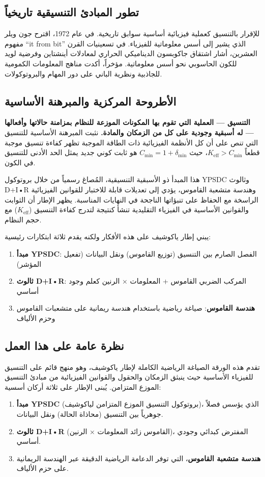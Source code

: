 \documentclass[11pt,a4paper]{article}
\begin{document}
	\subsection{تطور المبادئ التنسيقية تاريخياً}
	للإقرار بالتنسيق كعملية فيزيائية أساسية سوابق تاريخية. في عام 1972، اقترح جون ويلر مفهوم ``it from bit'' الذي يشير إلى أسس معلوماتية للفيزياء. في تسعينيات القرن العشرين، أشار اشتقاق جاكوبسون الديناميكي الحراري لمعادلات أينشتاين وفرضية لويد للكون الحاسوبي نحو أسس معلوماتية. مؤخراً، أكدت مناهج المعلومات الكمومية للجاذبية ونظرية الباني على دور المهام والبروتوكولات.
	
	\subsection{الأطروحة المركزية والمبرهنة الأساسية}
	
	\textbf{التنسيق — العملية التي تقوم بها المكونات الموزعة للنظام بمزامنة حالاتها وأفعالها — له أسبقية وجودية على كل من الزمكان والمادة.} نثبت المبرهنة الأساسية للتنسيق التي تنص على أن كل الأنظمة الفيزيائية ذات الطاقة الموجبة تظهر كفاءة تنسيق موجبة قطعاً $K_{\mathrm{eff}} > C_{\min}$، حيث $C_{\min} = 1 + \delta_{\min}$ هو ثابت كوني جديد يمثل الحد الأدنى للتنسيق في الكون.
	
	هذا المبدأ ذو الأسبقية التنسيقية، المُصاغ رسمياً من خلال بروتوكول YPSDC وثالوث D+I•R وهندسة متشعبة القاموس، يؤدي إلى تعديلات قابلة للاختبار للقوانين الفيزيائية الراسخة مع الحفاظ على تنبؤاتها الناجحة في النهايات المناسبة. يظهر الإطار أن الثوابت والقوانين الأساسية في الفيزياء التقليدية تنشأ كنتيجة لتدرج كفاءة التنسيق ($K_{\mathrm{eff}}$) مع حجم النظام.
	
	يبني إطار ياكوشيف على هذه الأفكار ولكنه يقدم ثلاثة ابتكارات رئيسية:
	\begin{enumerate}
		\item \textbf{مبدأ YPSDC}: الفصل الصارم بين التنسيق (توزيع القاموس) ونقل البيانات (تفعيل المؤشر)
		\item \textbf{ثالوث D+I•R}: المركب الضربي القاموس + المعلومات × الرنين كعلم وجود أساسي
		\item \textbf{هندسة القاموس}: صياغة رياضية باستخدام هندسة ريمانية على متشعبات القاموس وحزم الألياف
	\end{enumerate}
	
	\subsection{نظرة عامة على هذا العمل}
	تقدم هذه الورقة الصياغة الرياضية الكاملة لإطار ياكوشيف، وهو منهج قائم على التنسيق للفيزياء الأساسية حيث ينبثق الزمكان والحقول والقوانين الفيزيائية من مبادئ التنسيق الموزع المتزامن. يُبنى الإطار على ثلاثة أركان أسسية:
	\begin{enumerate}
		\item \textbf{مبدأ YPSDC} (بروتوكول التنسيق الموزع المتزامن لياكوشيف)، الذي يؤسس فصلاً جوهرياً بين التنسيق (محاذاة الحالة) ونقل البيانات.
		\item \textbf{ثالوث D+I•R} (القاموس زائد المعلومات × الرنين)، المفترض كبدائي وجودي أساسي.
		\item \textbf{هندسة متشعبة القاموس}، التي توفر الدعامة الرياضية الدقيقة عبر الهندسة الريمانية على حزم الألياف.
	\end{enumerate}
	
\end{document}
